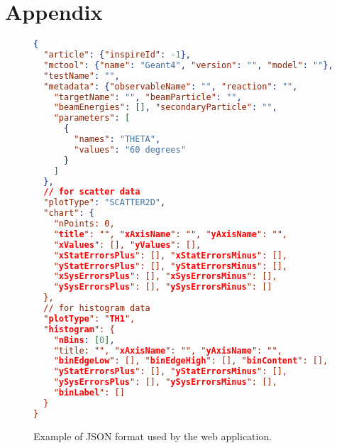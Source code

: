 \setcounter{figure}{0}
\renewcommand{\figurename}{Appendix}

\newpage
\section{Appendix}

\begin{figure}[h]

\begin{lstlisting}[language=json,firstnumber=1]
{
  "article": {"inspireId": -1},
  "mctool": {"name": "Geant4", "version": "", "model": ""},
  "testName": "",
  "metadata": {"observableName": "", "reaction": "",
    "targetName": "", "beamParticle": "",
    "beamEnergies": [], "secondaryParticle": "",
    "parameters": [
      {
        "names": "THETA",
        "values": "60 degrees"
      }
    ]
  },
  // for scatter data
  "plotType": "SCATTER2D",
  "chart": {
    "nPoints: 0,
    "title": "", "xAxisName": "", "yAxisName": "",
    "xValues": [], "yValues": [],
    "xStatErrorsPlus": [], "xStatErrorsMinus": [],
    "yStatErrorsPlus": [], "yStatErrorsMinus": [],
    "xSysErrorsPlus": [], "xSysErrorsMinus": [],
    "ySysErrorsPlus": [], "ySysErrorsMinus": []
  },
  // for histogram data
  "plotType": "TH1",
  "histogram": {
    "nBins: [0],
    "title: "", "xAxisName": "", "yAxisName": "",
    "binEdgeLow": [], "binEdgeHigh": [], "binContent": [],
    "yStatErrorsPlus": [], "yStatErrorsMinus": [],
    "ySysErrorsPlus": [], "ySysErrorsMinus": [],
    "binLabel": []
  }
}
\end{lstlisting}

\caption{Example of JSON format used by the web application.}
\label{adx:JSON-format}
\end{figure}



